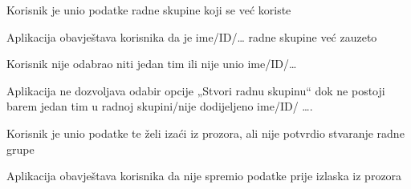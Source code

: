 \begin{packed_item}
\begin{packed_item}
                                    \item[3.b] Korisnik je unio podatke radne skupine koji se već koriste
                         				\item[] \begin{packed_enum}
											\item Aplikacija obavještava korisnika da je ime/ID/… radne skupine već zauzeto
			  									\end{packed_enum}

                      				 \item[3.c] Korisnik nije odabrao niti jedan tim ili nije unio ime/ID/…
										\item[] \begin{packed_enum}
										\item Aplikacija ne dozvoljava odabir opcije „Stvori radnu skupinu“ dok ne postoji barem   	jedan tim u radnoj skupini/nije dodijeljeno ime/ID/ ….
												\end{packed_enum}

                      				\item[3.d] Korisnik je unio podatke te želi izaći iz prozora, ali nije potvrdio stvaranje radne grupe
										\item[] \begin{packed_enum}
										\item Aplikacija obavještava korisnika da nije spremio podatke prije izlaska iz prozora
												\end{packed_enum}
									\end{packed_item}
							\end{packed_item}


